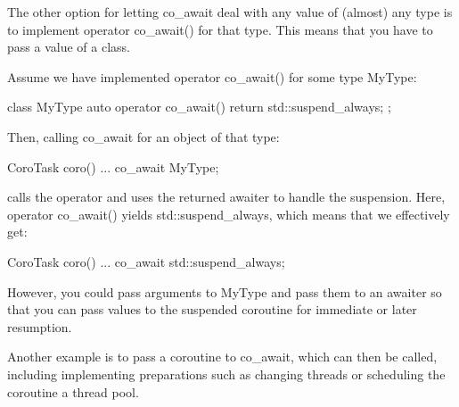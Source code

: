 
The other option for letting co\_await deal with any value of (almost) any type is to implement operator co\_await() for that type. This means that you have to pass a value of a class.

Assume we have implemented operator co\_await() for some type MyType:

\begin{cpp}
class MyType {
	auto operator co_await() {
		return std::suspend_always{};
	}
};
\end{cpp}

Then, calling co\_await for an object of that type:

\begin{cpp}
CoroTask coro()
{
	...
	co_await MyType{};
}
\end{cpp}

calls the operator and uses the returned awaiter to handle the suspension. Here, operator co\_await() yields std::suspend\_always{}, which means that we effectively get:

\begin{cpp}
CoroTask coro()
{
	...
	co_await std::suspend_always{};
}
\end{cpp}

However, you could pass arguments to MyType{} and pass them to an awaiter so that you can pass values to the suspended coroutine for immediate or later resumption.

Another example is to pass a coroutine to co\_await, which can then be called, including implementing preparations such as changing threads or scheduling the coroutine a thread pool.













